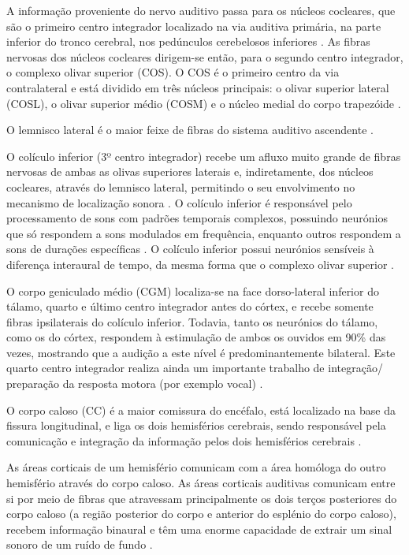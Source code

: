 \documentclass[output=paper,colorlinks,citecolor=brown,booklanguage=portuguese]{langscibook}
\begin{document}
A informação proveniente do nervo auditivo passa para os núcleos cocleares, que são o primeiro centro integrador localizado na via auditiva primária, na parte inferior do tronco cerebral, nos pedúnculos cerebelosos inferiores \citep{Aquino2002, Pujol2003, Martinez2003, Moller2006, Seikel2010}. As fibras nervosas dos núcleos cocleares dirigem-se então, para o segundo centro integrador, o complexo olivar superior (COS). O COS é o primeiro centro da via contralateral e está dividido em três núcleos principais: o olivar superior lateral (COSL), o olivar superior médio (COSM) e o núcleo medial do corpo trapezóide \citep{Musiek1986a, Martinez2003, Neijenhuis2003}.

O lemnisco lateral é o maior feixe de fibras do sistema auditivo ascendente \citep{Moller2006}.

O colículo inferior (3º centro integrador) recebe um afluxo muito grande de fibras nervosas de ambas as olivas superiores laterais e, indiretamente, dos núcleos cocleares, através do lemnisco lateral, permitindo o seu envolvimento no mecanismo de localização sonora \citep{Pickles1982, Moller1983, Bonaldi2004, Musiek2006, Seikel2010}. O colículo inferior é responsável pelo processamento de sons com padrões temporais complexos, possuindo neurónios que só respondem a sons modulados em frequência, enquanto outros respondem a sons de durações específicas \citep{Gulick1989, Purves2005}. O colículo inferior possui neurónios sensíveis à diferença interaural de tempo, da mesma forma que o complexo olivar superior \citep{Seikel2010}.

O corpo geniculado médio (CGM) localiza-se na face dorso-lateral inferior do tálamo, quarto e último centro integrador antes do córtex, e recebe somente fibras ipsilaterais do colículo inferior. Todavia, tanto os neurónios do tálamo, como os do córtex, respondem à estimulação de ambos os ouvidos em 90\% das vezes, mostrando que a audição a este nível é predominantemente bilateral. Este quarto centro integrador realiza ainda um importante trabalho de integração/ preparação da resposta motora (por exemplo vocal) \citep{Aquino2002, Pujol2003}.

O corpo caloso (CC) é a maior comissura do encéfalo, está localizado na base da fissura longitudinal, e liga os dois hemisférios cerebrais, sendo responsável pela comunicação e integração da informação pelos dois hemisférios cerebrais \citep{Snell2001, Bellis2003}.

As áreas corticais de um hemisfério comunicam com a área homóloga do outro hemisfério através do corpo caloso. As áreas corticais auditivas comunicam entre si por meio de fibras que atravessam principalmente os dois terços posteriores do corpo caloso (a região posterior do corpo e anterior do esplénio do corpo caloso), recebem informação binaural e têm uma enorme capacidade de extrair um sinal sonoro de um ruído de fundo \citep{Musiek1986, Bellis2003, Moller2006}.
\end{document}
